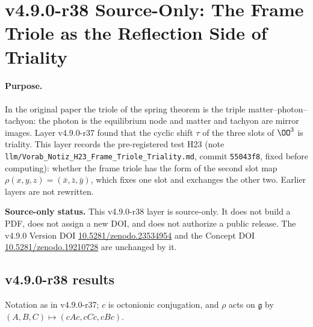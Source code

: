 \clearpage
\section*{v4.9.0-r38 Source-Only: The Frame Triole as the Reflection Side of Triality}
\label{sec:v490-r38-frame-triole-triality}

\paragraph{Purpose.}
In the original paper the triole of the spring theorem is the triple matter--photon--tachyon: the photon is the equilibrium node
and matter and tachyon are mirror images.  Layer v4.9.0-r37 found that the cyclic shift \(\tau\) of the three slots of \(\OO^3\) is
triality.  This layer records the pre-registered test H23 (note \texttt{llm/Vorab\_Notiz\_H23\_Frame\_Triole\_Triality.md}, commit
\texttt{55043f8}, fixed before computing): whether the frame triole has the form of the second slot map
\(\rho(x,y,z)=(\bar x,\bar z,\bar y)\), which fixes one slot and exchanges the other two.  Earlier layers are not rewritten.

\noindent\textbf{Source-only status.}
This v4.9.0-r38 layer is source-only.  It does not build a PDF, does not assign a new DOI,
and does not authorize a public release.  The v4.9.0 Version DOI
\href{https://doi.org/10.5281/zenodo.23534954}{10.5281/zenodo.23534954} and the Concept DOI
\href{https://doi.org/10.5281/zenodo.19210728}{10.5281/zenodo.19210728} are unchanged by it.

\subsection*{v4.9.0-r38 results}
\label{subsec:v490-r38-results}

Notation as in v4.9.0-r37; \(c\) is octonionic conjugation, and \(\rho\) acts on \(\mathfrak g\) by
\((A,B,C)\mapsto(cAc,cCc,cBc)\).


